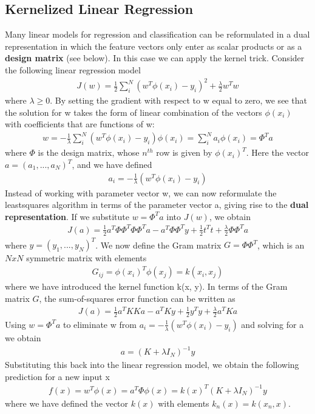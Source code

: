 \documentclass[main]{subfiles}
\begin{document}
\subsection{Kernelized Linear Regression}
Many linear models for regression and classification can be reformulated in a dual representation in which the feature vectors only enter as scalar products or as a \textbf{design matrix} (see below). In this case we can apply the kernel trick.
Consider the following linear regression model
\begin{align}
J(w)=\frac{1}{2} \sum_i^N (w^T \phi(x_i)-y_i)^2 + \frac{\lambda}{2} w^T w
\end{align}
where $\lambda \geq 0$. By setting the gradient with respect to w equal to zero,  we see that the solution for w takes the form of linear combination of the vectors $\phi(x_i)$ with coefficients that are functions of w:
\begin{align}
w=-\frac{1}{\lambda}\sum_i^N(w^T \phi(x_i)-y_i)\phi(x_i)=\sum_i^N a_i \phi(x_i)=\Phi^T a
\end{align}
where $\Phi$ is the design matrix, whose $n^{th}$ row is given by $\phi(x_i)^T$. Here the vector $a=(a_1, ..., a_N)^T$, and we have defined
\begin{align}
a_i=-\frac{1}{\lambda}(w^T \phi(x_i)-y_i)
\end{align}
Instead of working with parameter vector w, we can now reformulate the leastsquares algorithm in terms of the parameter vector a, giving rise to the \textbf{dual representation}. If we substitute $w=\Phi^T a$ into $J(w)$, we obtain
\begin{align}
J(a)=\frac{1}{2}a^T \Phi \Phi^T \Phi \Phi^T a - a^T \Phi \Phi^T y + \frac{1}{2}t^T t + \frac{\lambda}{2} \Phi \Phi^T a
\end{align}
where $y=(y_1,...,y_N)^T$. We now define the Gram matrix $G= \Phi \Phi^T$, which is an $N x N$ symmetric matrix with elements
\begin{align}
G_{ij} = \phi(x_i)^T \phi(x_j)=k(x_i, x_j)
\end{align}
where we have introduced the kernel function k(x, y). In terms of the Gram matrix $G$, the sum-of-squares error function can be written as
\begin{align}
J(a)=\frac{1}{2}a^T KKa - a^T Ky + \frac{1}{2}y^T y + \frac{\lambda}{2}a^T Ka
\end{align}
Using $w=\Phi^T a$ to eliminate w from $a_i=-\frac{1}{\lambda}(w^T \phi(x_i)-y_i)$ and solving for a we obtain
\begin{align}
a=(K + \lambda I_N)^{-1} y
\end{align}
Substituting this back into the linear regression model, we obtain the following prediction for a new input x
\begin{align}
f(x)=w^T \phi(x)=a^T \Phi \phi(x) = k(x)^T (K+\lambda I_N)^{-1} y
\end{align}
where we have defined the vector $k(x)$ with elements $k_n(x) = k(x_n, x)$. 
\end{document}
